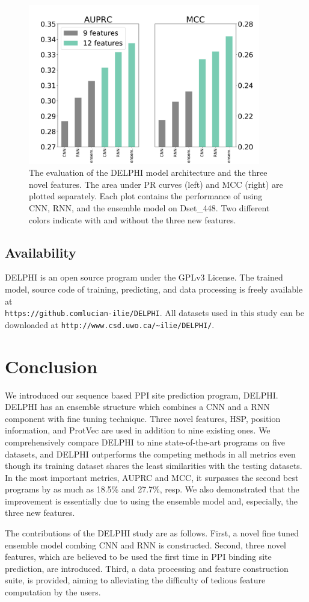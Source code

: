\begin{figure}
\centering
\includegraphics[width=\columnwidth, height=7cm]{img/CNN_RNN_ensemble.pdf}
  \caption[The evaluation of the DELPHI model architecture and the three novel features.]{The evaluation of the DELPHI model architecture and the three novel features. The area under PR curves (left) and MCC (right) are plotted separately. Each plot contains the performance of using CNN, RNN, and the ensemble model on Dset\_448. Two different colors indicate with and without the three new features.}
  \label{fig_CNN_RNN_ensemble}
\end{figure}

\subsection{Availability}
DELPHI is an open source program under the GPLv3 License. The trained model, source code of training, predicting, and data processing is freely available at\\ \texttt{https://github.comlucian-ilie/DELPHI}. 
All datasets used in this study can be downloaded at \texttt{http://www.csd.uwo.ca/\~{}ilie/DELPHI/}.\\
\section{Conclusion}
We introduced our sequence based PPI site prediction program, DELPHI. DELPHI has an ensemble structure which combines a CNN and a RNN component with fine tuning technique. Three novel features, HSP, position information, and ProtVec are used in addition to nine existing ones. We comprehensively compare DELPHI to nine state-of-the-art programs on five datasets, and DELPHI outperforms the competing methods in all metrics even though its training dataset shares the least similarities with the testing datasets. In the most important metrics, AUPRC and MCC, it surpasses the second best programs by as much as 18.5\% and 27.7\%, resp. We also demonstrated that the improvement is essentially due to using the ensemble model and, especially, the three new features.

The contributions of the DELPHI study are as follows. First, a novel fine tuned ensemble model combing CNN and RNN is constructed. Second, three novel features, which are believed to be used the first time in PPI binding site prediction, are introduced. Third, a data processing and feature construction suite, is provided, aiming to alleviating the difficulty of tedious feature computation by the users.